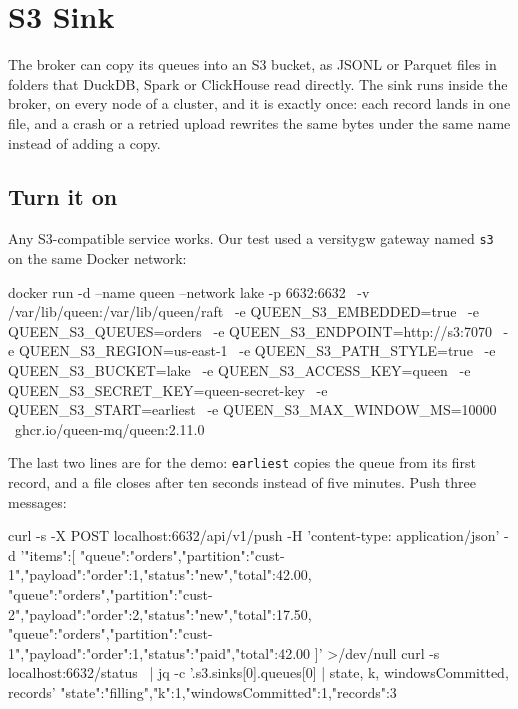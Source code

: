 
\section{S3 Sink}

The broker can copy its queues into an S3 bucket, as JSONL or Parquet files in folders that DuckDB,
Spark or ClickHouse read directly. The sink runs inside the broker, on every node of a cluster, and
it is exactly once: each record lands in one file, and a crash or a retried upload rewrites the same
bytes under the same name instead of adding a copy.


\subsection{Turn it on}

Any S3-compatible service works. Our test used a versitygw gateway named \texttt{s3} on the same
Docker network:

\begin{shell}
docker run -d --name queen --network lake -p 6632:6632 \
  -v /var/lib/queen:/var/lib/queen/raft \
  -e QUEEN_S3_EMBEDDED=true \
  -e QUEEN_S3_QUEUES=orders \
  -e QUEEN_S3_ENDPOINT=http://s3:7070 \
  -e QUEEN_S3_REGION=us-east-1 \
  -e QUEEN_S3_PATH_STYLE=true \
  -e QUEEN_S3_BUCKET=lake \
  -e QUEEN_S3_ACCESS_KEY=queen \
  -e QUEEN_S3_SECRET_KEY=queen-secret-key \
  -e QUEEN_S3_START=earliest \
  -e QUEEN_S3_MAX_WINDOW_MS=10000 \
  ghcr.io/queen-mq/queen:2.11.0
\end{shell}

The last two lines are for the demo: \texttt{earliest} copies the queue from its first record, and
a file closes after ten seconds instead of five minutes. Push three messages:

\begin{shell}
curl -s -X POST localhost:6632/api/v1/push -H 'content-type: application/json' -d '{"items":[
  {"queue":"orders","partition":"cust-1","payload":{"order":1,"status":"new","total":42.00}},
  {"queue":"orders","partition":"cust-2","payload":{"order":2,"status":"new","total":17.50}},
  {"queue":"orders","partition":"cust-1","payload":{"order":1,"status":"paid","total":42.00}}
]}' >/dev/null
curl -s localhost:6632/status \
  | jq -c '.s3.sinks[0].queues[0] | {state, k, windowsCommitted, records}'
{"state":"filling","k":1,"windowsCommitted":1,"records":3}
\end{shell}

